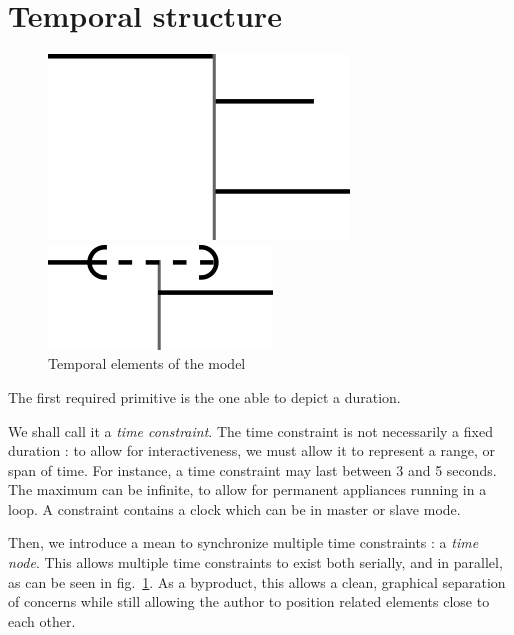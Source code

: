 \documentclass{sigchi}
\begin{document}
\section{Temporal structure}\label{sec.temporal}
\begin{figure}[h]
    \centering
    \begin{minipage}[b]{.5\linewidth}
        \centering
        \includegraphics[scale=0.6]{images/timenode.png}
    \end{minipage}\begin{minipage}[b]{.5\linewidth}
    \centering
    \includegraphics[scale=0.6]{images/souple.png}
\end{minipage}	

\caption{Temporal elements of the model}
\label{fig.cst.timenode}
\end{figure}	

The first required primitive is the one able to depict a duration.

We shall call it a \textit{time constraint}.
The time constraint is not necessarily a fixed duration : to allow for interactiveness, 
we must allow it to represent a range, or span of time. For instance, a time constraint may last between 3 and 5 seconds. The maximum can be infinite, to allow for permanent appliances running in a loop. A constraint contains a clock which can be in master or slave mode.

Then, we introduce a mean to synchronize multiple time constraints : a \textit{time node}. 
This allows multiple time constraints to exist both serially, and in parallel, as can be seen in fig.~\ref{fig.cst.timenode}. 
As a byproduct, this allows a clean, graphical separation of concerns while still allowing the author to position related elements close to each other. %
\end{document}
